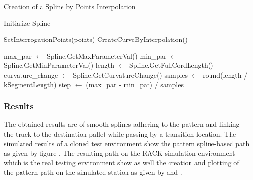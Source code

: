 \begin{algorithm}[H]
    \caption{Creation of a Spline by Points Interpolation}\label{alg:createSplines}

    \SetAlgoLined
    
    Initialize Spline\;
    
    SetInterrogationPoints(points)\;
    CreateCurveByInterpolation()\;
    
    max\_par $\gets$ Spline.GetMaxParameterVal()\;
    min\_par $\gets$ Spline.GetMinParameterVal()\;
    length $\gets$ Spline.GetFullCordLength()\;
    curvature\_change $\gets$ Spline.GetCurvatureChange()\;
    samples $\gets$ round(length / kSegmentLength)\;
    step $\gets$ (max\_par - min\_par) / samples\;
    
    
    \;
    
    \end{algorithm}


\subsubsection{Results}
The obtained results are of smooth splines adhering to the pattern and linking the truck to the destination pallet 
while passing by a transition location. 
The simulated results of a cloned test environment show the pattern spline-based path as given by figure .
The resulting path on the RACK simulation environment which is the real testing environment show as well the creation and 
plotting of the pattern path on the simulated station as given by  and . 

